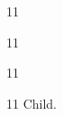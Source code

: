 \documentclass[paper=A4]{ropas-poster}
\begin{document}
\begin{postergrid}{1}{1}
\begin{posterblock}{1}{1}
\begin{postergrid}{1}{1}
\begin{posterblock}{1}{1}
Child.
\end{posterblock}
\end{postergrid}
\end{posterblock}
\end{postergrid}
\end{document}
